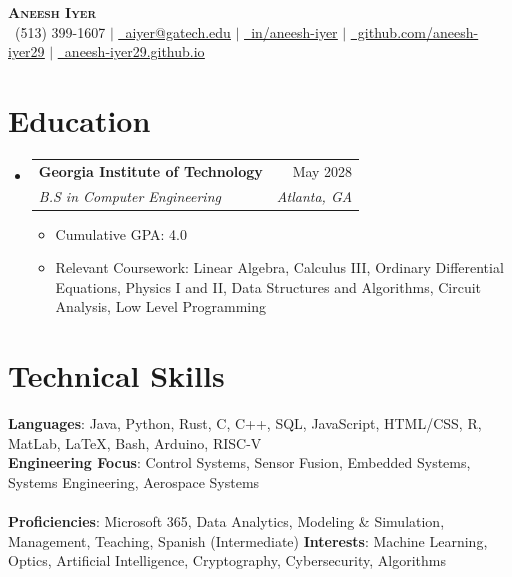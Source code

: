 \documentclass[letterpaper,11pt]{article}
\makeatletter
\newcommand{\resumeSubheading}[4]{
  \vspace{-2pt}\item
    \begin{tabular*}{0.97\textwidth}[t]{l@{\extracolsep{\fill}}r}
      \textbf{#1} & #2 \\
      \textit{\small#3} & \textit{\small #4} \\
    \end{tabular*}\vspace{-7pt}
}
\newcommand{\resumeSubHeadingListStart}{\begin{itemize}[leftmargin=0.15in, label={}]}
\newcommand{\resumeSubHeadingListEnd}{\end{itemize}}
\makeatother
\begin{document}

\begin{center}
    \textbf{\Huge \scshape Aneesh Iyer} \\ \vspace{1pt}
    \small \faPhone\ (513) 399-1607 $|$ \href{mailto:aiyer@gatech.edu}{\underline{\faEnvelope\ aiyer@gatech.edu}} $|$ 
    \href{https://linkedin.com/in/aneesh-iyer}{\underline{\faLinkedin\ in/aneesh-iyer}} $|$
    \href{https://github.com/aneesh-iyer29}{\underline{\faGithub\ github.com/aneesh-iyer29}} $|$ \href{https://aneesh-iyer29.github.io/}{\underline{\faGlobe\ aneesh-iyer29.github.io}}
\end{center}


\section{Education}
  \resumeSubHeadingListStart
    \resumeSubheading
      {Georgia Institute of Technology}{May 2028}
      {B.S in Computer Engineering}{Atlanta, GA}
      \begin{itemize}[label=--]
          \item Cumulative GPA: 4.0
          \item Relevant Coursework: Linear Algebra, Calculus III, Ordinary Differential Equations, Physics I and II, Data Structures and Algorithms, Circuit Analysis, Low Level Programming
      \end{itemize}
  \resumeSubHeadingListEnd

\section{Technical Skills}
 \begin{itemize}[leftmargin=0.15in, label={}]
    \small{\item{
     \textbf{Languages}{: Java, Python, Rust, C, C++, SQL, JavaScript, HTML/CSS, R, MatLab, \LaTeX, Bash, Arduino, RISC-V} \\
     \textbf{Engineering Focus}{: Control Systems, Sensor Fusion, Embedded Systems, Systems Engineering, Aerospace Systems} \\
     \\
     \textbf{Proficiencies}{: Microsoft 365, Data Analytics, Modeling \& Simulation, Management, Teaching, Spanish (Intermediate)}
     \textbf{Interests}{: Machine Learning, Optics, Artificial Intelligence, Cryptography, Cybersecurity, Algorithms}
    }}
 \end{itemize}
\end{document}
